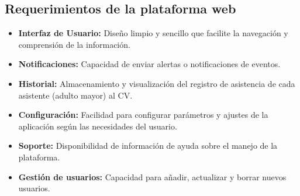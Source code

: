 \subsection{Requerimientos de la plataforma web}

\begin{itemize}

     \item \textbf{Interfaz de Usuario:} Diseño limpio y sencillo que facilite la navegación y comprensión de la información.
     \item \textbf{Notificaciones:} Capacidad de enviar alertas o notificaciones de eventos.
     \item \textbf{Historial:} Almacenamiento y visualización del registro de asistencia de cada asistente (adulto mayor) al CV.
     \item \textbf{Configuración:} Facilidad para configurar parámetros y ajustes de la aplicación según las necesidades del usuario.
     \item \textbf{Soporte: }Disponibilidad de información de ayuda sobre el manejo de la plataforma.
     \item \textbf{Gestión de usuarios: } Capacidad para añadir, actualizar y borrar nuevos usuarios.
\end{itemize}
